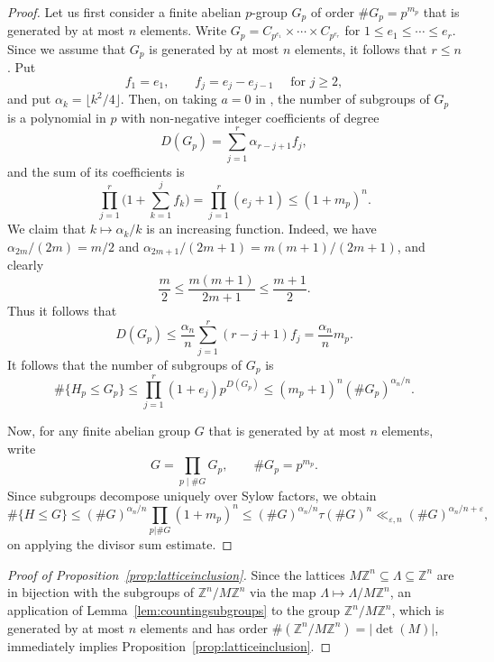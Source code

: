 \documentclass[11pt,reqno]{amsart}
\theoremstyle{definition}
\theoremstyle{remark}
\numberwithin{equation}{section}
\numberwithin{thm}{section}
\numberwithin{table}{section}
\def \Z {{\mathbb Z}}
\begin{document}
\begin{proof}
     Let us first consider a finite abelian $p$-group $G_p$  of order $\# G_p = p^{m_p}$ that is generated by at most $n$ elements. Write 
     $G_p = C_{p^{e_1}} \times \cdots \times C_{p^{e_r}}$ for 
     $1 \le e_1 \le \cdots \le e_r$.
    Since
     we assume that $G_p$ is generated by at most $n$ elements, it follows that $r \le n$. 
     Put 
     \[
     f_1 = e_1, \qquad f_j = e_j - e_{j-1} \quad \text{ for $j \ge 2$},  
     \]
     and  put 
     $
     \alpha_k = \lfloor k^2/4 \rfloor.
     $
     Then, on  taking $a=0$ in \cite[Theorem~3]{bhowmik_wu_zeta2001}, the number of subgroups of $G_p$ is a polynomial in $p$ with non-negative integer coefficients of degree 
     \[
     D(G_p) = \sum_{j=1}^r \alpha_{r-j+1}f_j,
     \]
      and the sum of its coefficients is 
     \[
     \prod_{j=1}^r \bigg( 1+ 
     \sum_{k=1}^j f_k
     \bigg) = \prod_{j=1}^r (e_j +1) \le (1+m_p)^n.
     \]
     We claim that  $k \mapsto \alpha_k/k$ is an increasing function. Indeed, we have 
     $\alpha_{2m}/(2m) =m/2$ and $\alpha_{2m+1}/(2m+1) =m(m+1)/(2m+1)$, and clearly
     $$
     \frac{m}{2}\leq \frac{m(m+1)}{2m+1}\leq\frac{m+1}{2}.
     $$
     Thus it follows that 
     \[
     D(G_p) \le \frac{\alpha_n}{n}
     \sum_{j=1}^r (r-j+1)f_j = \frac{\alpha_n}{n} m_p.
     \]
     It follows that the number of subgroups of $G_p$ is  
     \[
     \# \{ 
     H_p \le G_p
     \} \le \prod_{j=1}^r (1+e_j) p^{D(G_p)} \le (m_p+1)^n (\# G_p)^{\alpha_n / n}. 
     \]

     Now, for any finite abelian group $G$ that is generated by at most $n$ elements, write 
     \[
     G = \prod_{p \mid \#  G} G_p, \qquad \# G_p = p^{m_p}. 
     \]
Since      subgroups decompose uniquely over Sylow factors, we obtain
     \[
     \# \{ H \le G \}
     \le (\# G)^{\alpha_n/n}  \prod_{p | \#  G} (1+m_p)^n \le (\# G)^{\alpha_n/n} \tau (\# G)^n \ll_{\varepsilon,n} (\# G)^{\alpha_n/n + \varepsilon},
     \]   
     on applying the divisor sum estimate.
\end{proof}

\begin{proof}[Proof of Proposition~\ref{prop:latticeinclusion}]
    Since the lattices $M\Z^n\subseteq \mathsf{\Lambda} \subseteq \Z^n$ are in bijection with the subgroups of $\Z^n/M\Z^n$ via the map $\mathsf{\Lambda} \mapsto \mathsf{\Lambda}/M\Z^n$, an application of Lemma~\ref{lem:countingsubgroups} to the group $\Z^n/M\Z^n$, which is generated by at most $n$ elements and has order $\#(\Z^n/M\Z^n) = |\det(M)|$, immediately implies Proposition~\ref{prop:latticeinclusion}.    
\end{proof}
\end{document}
